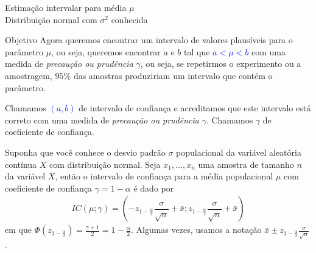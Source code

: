 \documentclass[8pt]{beamer}
\begin{document}
\small
\begin{frame}{Estimação intervalar para média $\mu$\\ Distribuição normal com $\sigma^2$ conhecida}
 \begin{block}{Objetivo}
  Agora queremos encontrar um intervalo de valores plausíveis para o parâmetro $\mu$, ou seja, queremos encontrar $a$ e $b$ tal que \textcolor{blue}{$a < \mu < b$} com uma medida de \textit{precaução ou prudência} $\gamma$, ou seja, se repetirmos o experimento ou a amostragem, $95\%$ das amostras produziriam um intervalo que contém o parâmetro.
  \vspace{0.25cm}
  
  Chamamos \textcolor{blue}{$(a, b)$} de intervalo de confiança e acreditamos que este intervalo está correto com uma medida de \textit{precaução ou prudência}   $ \gamma$. Chamamos $\gamma$ de coeficiente de confiança.
 \end{block}
\vfill

Suponha que você conhece o desvio padrão $\sigma$ populacional da variável aleatória contínua $X$ com distribuição normal. Seja $x_1, \dots, x_n$ uma amostra de tamanho $n$ da variável $X$, então o intervalo de confiança para a média populacional $\mu$ com coeficiente de confiança $\gamma = 1 - \alpha$ 
é dado por
\begin{align*}
IC(\mu; \gamma) = \left( -z_{1-\frac{\alpha}{2}}\dfrac{\sigma}{\sqrt{n}} + \bar{x}; z_{1-\frac{\alpha}{2}}\dfrac{\sigma}{\sqrt{n}} + \bar{x} \right)
\end{align*}
em que $\Phi(z_{1-\frac{\alpha}{2}}) = \frac{\gamma + 1}{2} = 1 - \frac{\alpha}{2}$. Algumas vezes, usamos a notação $\bar{x} \pm z_{1-\frac{\alpha}{2}} \frac{\sigma}{\sqrt{n}}$.
\end{frame}
\normalsize
\end{document}
